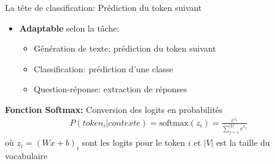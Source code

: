 \documentclass[aspectratio=169]{beamer}
\begin{document}
\begin{frame}{La tête de classification: Prédiction du token suivant}
    \begin{itemize}
        \item \textbf{Adaptable} selon la tâche:
        \begin{itemize}
            \item Génération de texte: prédiction du token suivant
            \item Classification: prédiction d'une classe
            \item Question-réponse: extraction de réponses
        \end{itemize}
    \end{itemize}
    \vspace{0.5cm}
    \begin{center}
        \textbf{Fonction Softmax:} Conversion des logits en probabilités
        \begin{align*}
            P(token_i | contexte) = \text{softmax}(z_i) = \frac{e^{z_i}}{\sum_{j=1}^{|V|} e^{z_j}}
        \end{align*}
        où $z_i = (Wx + b)_i$ sont les logits pour le token $i$ et $|V|$ est la taille du vocabulaire
    \end{center}
\end{frame}
\end{document}
